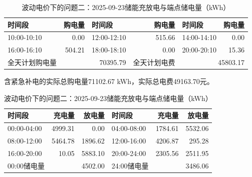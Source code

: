 \begin{table}[H]\centering\small\setlength{\tabcolsep}{5pt}
\caption{波动电价下的问题二：2025-09-23购电结果（电量：kWh；费用：元）}
\begin{tabular}{lrlrlr}\toprule
时间段 & 购电量 & 时间段 & 购电量 & 时间段 & 购电量 \\\midrule
10:00-10:10 & 0.00 & 12:00-12:10 & 515.66 & 14:00-14:10 & 0.00\\
16:00-16:10 & 504.21 & 18:00-18:10 & 0.00 & 20:00-20:10 & 15.36\\
\midrule 全天计划购电量 & \multicolumn{2}{r}{70395.79} & 全天计划电费 & \multicolumn{2}{r}{45803.17}\\\bottomrule
\end{tabular}
\par\vspace{2pt}\footnotesize
含紧急补电的实际总购电量71102.67 kWh，实际总电费49163.70元。
\vspace{3pt}\small
\caption{波动电价下的问题二：2025-09-23储能充放电与端点储电量（kWh）}
\begin{tabular}{lrrlrr}\toprule
时间段 & 充电量 & 放电量 & 时间段 & 充电量 & 放电量 \\\midrule
00:00-04:00 & 4999.31 & 0.00 & 04:00-08:00 & 1784.61 & 5532.06\\
08:00-12:00 & 5464.78 & 1896.62 & 12:00-16:00 & 4206.87 & 295.28\\
16:00-20:00 & 10.05 & 5883.10 & 20:00-24:00 & 2305.56 & 2511.95\\
\midrule 00:00储电量 & \multicolumn{2}{r}{4502.00} & 24:00储电量 & \multicolumn{2}{r}{3486.06}\\\bottomrule
\end{tabular}\end{table}
